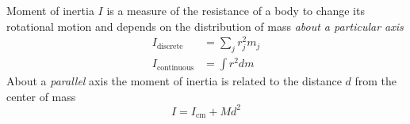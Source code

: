 Moment of inertia $I$ is a measure of the resistance of a body to change its
rotational motion and depends on the distribution of mass \emph{about a
  particular axis}
\begin{align*}
  I_{\text{discrete}} &= \textstyle\sum_j r_j^2 m_j\\
  I_{\text{continuous}} &= \textstyle\int r^2 dm
\end{align*}
About a \emph{parallel} axis the moment of inertia is related to the
distance $d$ from the center of mass
\begin{equation*}
  I = I_{\text{cm}} + M d^2
\end{equation*}

